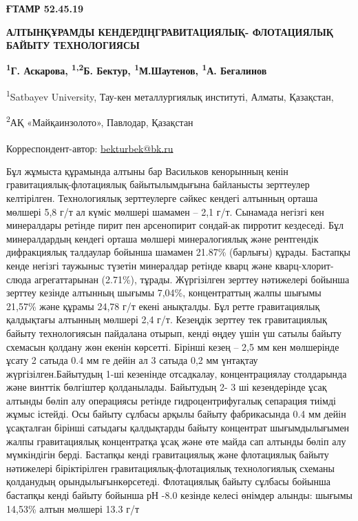 

\newpage
{\bfseries ҒТАМР 52.45.19}

{\bfseries АЛТЫНҚҰРАМДЫ КЕНДЕРДІҢГРАВИТАЦИЯЛЫҚ- ФЛОТАЦИЯЛЫҚ БАЙЫТУ
ТЕХНОЛОГИЯСЫ}

{\bfseries \textsuperscript{1}Г. Аскарова, \textsuperscript{1,2}Б.
Бектур\textsuperscript{\envelope }, \textsuperscript{1}М.Шаутенов,
\textsuperscript{1}А. Бегалинов}

\textsuperscript{1}Satbayev University, Тау-кен металлургиялық
институті, Алматы, Қазақстан,

\textsuperscript{2}АҚ «Майқаинзолото», Павлодар, Қазақстан

{\bfseries \textsuperscript{\envelope }}Корреспондент-автор:
\href{mailto:bekturbek@bk.run}{bekturbek@bk.ru}

Бұл жұмыста құрамында алтыны бар Васильков кенорынның кенін
гравитациялық-флотациялық байытылымдығына байланысты зерттеулер
келтірілген. Технологиялық зерттеулерге сәйкес кендегі алтынның орташа
мөлшері 5,8 г/т ал күміс мөлшері шамамен -- 2,1 г/т. Сынамада негізгі
кен минералдары ретінде пирит пен арсенопирит сондай-ак пирротит
кездеседі. Бұл минералдардың кендегі орташа мөлшері минералогиялық және
рентгендік дифракциялық талдаулар бойынша шамамен 21.87\% (барлығы)
құрады. Бастапқы кенде негізгі таужыныс түзетін минералдар ретінде кварц
және кварц-хлорит-слюда агрегаттарынан (2.71\%), тұрады. Жүргізілген
зерттеу нәтижелері бойынша зерттеу кезінде алтынның шығымы 7,04\%,
концентраттың жалпы шығымы 21,57\% және құрамы 24,78 г/т екені
анықталды. Бұл ретте гравитациялық қалдықтағы алтынның мөлшері 2,4 г/т.
Кезеңдік зерттеу тек гравитациялық байыту технологиясын пайдалана
отырып, кенді өңдеу үшін үш сатылы байыту схемасын қолдану жөн екенін
көрсетті. Бірінші кезең -- 2,5 мм кен мөлшерінде ұсату 2 сатыда 0.4 мм
ге дейін ал 3 сатыда 0,2 мм үнтақтау жүргізілген.Байытудың 1-ші
кезенінде отсадкалау, концентрациялау столдарында және винттік бөлгіштер
қолданылады. Байытудың 2- 3 ші кезендерінде ұсақ алтынды бөліп алу
операциясы ретінде гидроцентрифугалық сепарация тиімді жұмыс істейді.
Осы байыту сұлбасы арқылы байыту фабрикасында 0.4 мм дейін ұсақталған
бірінші сатыдағы қалдықтарды байыту концентрат шығымдылығымен жалпы
гравитациялық концентратқа ұсақ және өте майда сап алтынды бөліп алу
мүмкіндігін берді. Бастапқы кенді гравитациялық және флотациялық байыту
нәтижелері біріктірілген гравитациялық-флотациялық технологиялық схеманы
қолданудың орындылығынкөрсетеді. Флотациялық байыту сұлбасы бойынша
бастапқы кенді байыту бойынша рН -8.0 кезінде келесі өнімдер алынды:
шығымы 14,53\% алтын мөлшері 13.3 г/т


